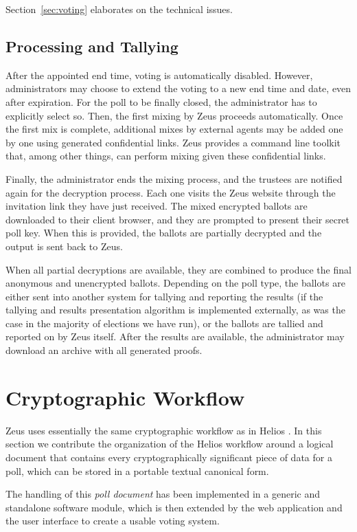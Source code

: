 \documentclass[letterpaper,10pt]{article}
\begin{document}
Section~\ref{sec:voting} elaborates on the technical issues.

\subsection{Processing and Tallying}
After the appointed end time, voting is automatically disabled.
However, administrators may choose to extend the voting to a new end
time and date, even after expiration.
For the poll to be finally closed,
the administrator has to explicitly select so.
Then, the first mixing by Zeus proceeds automatically.
Once the first mix is complete, additional mixes by external agents
may be added one by one using generated confidential links.
Zeus provides a command line toolkit that, among other things, can
perform mixing given these confidential links.

Finally, the administrator ends the mixing process,
and the trustees are notified again for the decryption process.
Each one visits the Zeus website through the invitation link they have
just received.
The mixed encrypted ballots are downloaded to their client browser,
and they are prompted to present their secret poll key.
When this is provided, the ballots are partially decrypted 
and the output is sent back to Zeus.

When all partial decryptions are available, they are combined to produce
the final anonymous and unencrypted ballots.
Depending on the poll type, the ballots are either sent into another
system for tallying and reporting the results (if the tallying
and results presentation algorithm is implemented externally, as was
the case in the majority of elections we have run),
or the ballots are tallied and reported on by Zeus itself.
After the results are available,
the administrator may download an archive with all generated proofs.

\section{Cryptographic Workflow}
\label{sec:crypto_workflow}

Zeus uses essentially the same cryptographic workflow as in Helios
\cite{adida:2008}.
In this section we contribute the organization of the Helios workflow
around a logical document that contains every cryptographically
significant piece of data for a poll,
which can be stored in a portable textual canonical form.

The handling of this \emph{poll document} has been implemented in a
generic and standalone software module, which is then extended by the
web application and the user interface to create a usable voting system.
\end{document}
